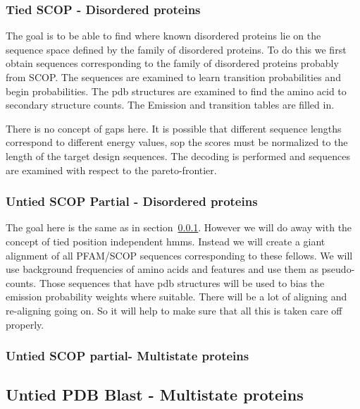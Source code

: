 \documentclass{article}
\begin{document}
\subsubsection{Tied SCOP - Disordered proteins}
\label{exp:tied_scop_disordered}
The goal is to be able to find where known disordered proteins lie on the sequence space defined by the family of disordered proteins. To do this we first obtain sequences corresponding to the family of disordered   proteins probably from SCOP. The sequences are examined to learn transition probabilities and begin probabilities. The pdb structures are examined to find the amino acid to secondary structure counts. The Emission and transition tables are filled in. 

There is no concept of gaps here. It is possible that different sequence lengths correspond to different energy values, sop the scores must be normalized to the length of the target design sequences. The decoding is performed and sequences are examined with respect to the pareto-frontier. 


\subsubsection{Untied SCOP Partial - Disordered proteins}
\label{exp:untied_scop_disordered}
The goal here is the same as in section~\ref{exp:tied_scop_disordered}. However we will do away with the concept of tied position independent hmms. Instead we will create a giant alignment of all PFAM/SCOP sequences corresponding to these fellows. We will use background frequencies of amino acids and features and use them as pseudo-counts. Those sequences that have pdb structures will be used to bias the emission probability weights where suitable. There will be a lot of aligning and re-aligning going on. So it will help to make sure that all this is taken care off properly.



\subsubsection{Untied SCOP partial- Multistate proteins}


\subsection{Untied PDB Blast - Multistate proteins}



\end{document}
